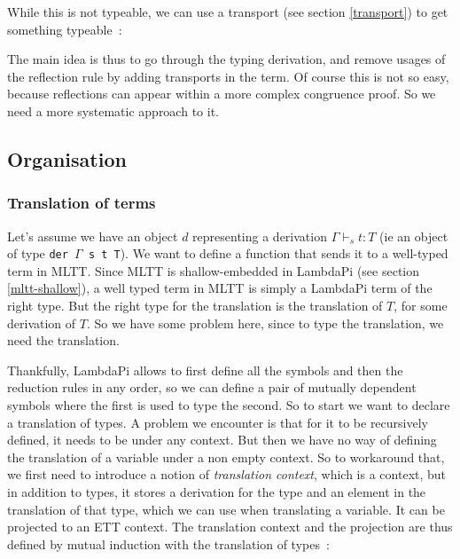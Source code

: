 \begin{center}\begin{prooftree}
\end{prooftree}\end{center}

While this is not typeable, we can use a transport (see section \ref{transport})
to get something typeable~:

\begin{center}\begin{prooftree}
\end{prooftree}\end{center}

The main idea is thus to go through the typing derivation, and remove usages of
the reflection rule by adding transports in the term. Of course this is not so
easy, because reflections can appear within a more complex congruence proof. So
we need a more systematic approach to it.

\subsection{Organisation}

\subsubsection{Translation of terms}

Let's assume we have an object $d$ representing a derivation $\Gamma\vdash_{s} t : T$ (ie
an object of type \texttt{der $\Gamma$ s t T}). We want to define a function that
sends it to a well-typed term in MLTT. Since MLTT is shallow-embedded in
LambdaPi (see section \ref{mltt-shallow}), a well typed term in MLTT is simply a
LambdaPi term of the right type. But the right type for the translation is the
translation of $T$, for some derivation of $T$. So we have some problem here,
since to type the translation, we need the translation.

Thankfully, LambdaPi allows to first define all the symbols and then the
reduction rules in any order, so we can define a pair of mutually dependent
symbols where the first is used to type the second. So to start we want to
declare a translation of types. A problem we encounter is that for it to be
recursively defined, it needs to be under any context. But then we have no way
of defining the translation of a variable under a non empty context. So to
workaround that, we first need to introduce a notion of \emph{translation
context}, which is a context, but in addition to types, it stores a derivation
for the type and an element in the translation of that type, which we can use
when translating a variable. It can be projected to an ETT context. The
translation context and the projection are thus defined by mutual induction with
the translation of types~:

